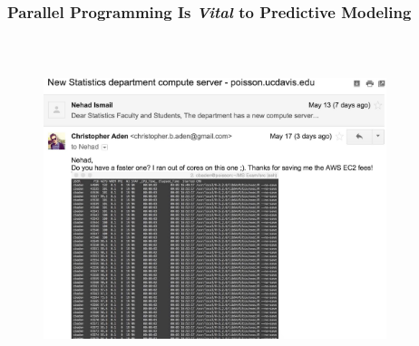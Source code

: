 \documentclass[handout]{beamer}
\begin{document}
\begin{frame}
\frametitle{Parallel Programming Is \emph{Vital} to Predictive Modeling}
\begin{figure}[H]
\includegraphics[width=10cm, height=10cm]{pp.jpg}
\end{figure}
\end{frame}
\end{document}
